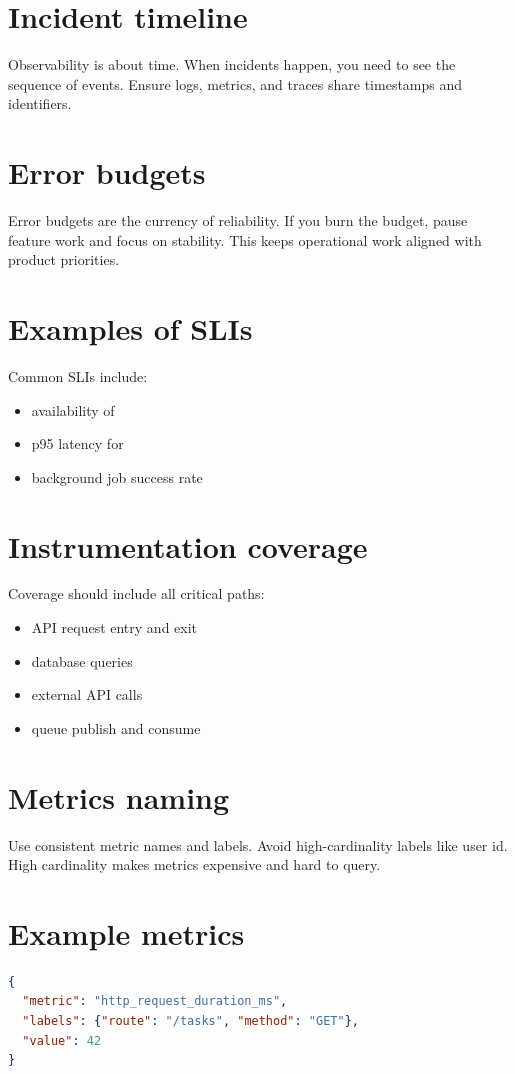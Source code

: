 \section{Incident timeline}
Observability is about time.
When incidents happen, you need to see the sequence of events.
Ensure logs, metrics, and traces share timestamps and identifiers.

\section{Error budgets}
Error budgets are the currency of reliability.
If you burn the budget, pause feature work and focus on stability.
This keeps operational work aligned with product priorities.

\section{Examples of SLIs}
Common SLIs include:
\begin{itemize}[nosep]
  \item availability of 
  \item p95 latency for 
  \item background job success rate
\end{itemize}

\section{Instrumentation coverage}
Coverage should include all critical paths:
\begin{itemize}[nosep]
  \item API request entry and exit
  \item database queries
  \item external API calls
  \item queue publish and consume
\end{itemize}

\section{Metrics naming}
Use consistent metric names and labels.
Avoid high-cardinality labels like user id.
High cardinality makes metrics expensive and hard to query.

\section{Example metrics}
\begin{lstlisting}[language=JSON]
{
  "metric": "http_request_duration_ms",
  "labels": {"route": "/tasks", "method": "GET"},
  "value": 42
}
\end{lstlisting}

